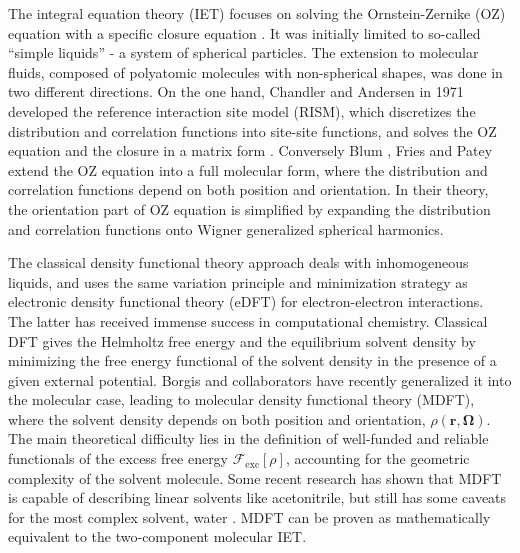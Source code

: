 The integral equation theory (\acs{IET}) focuses on solving the Ornstein-Zernike
(\acs{OZ}) equation with a specific closure equation \citep{Hensen-McDonald,Gray-Gubbins}.
It was initially limited to so-called ``simple liquids'' - a system
of spherical particles. The extension to molecular fluids, composed
of polyatomic molecules with non-spherical shapes, was done in two
different directions. On the one hand, Chandler and Andersen in 1971 \citep{Chandler_1972_RISM}
developed the reference interaction site model (\acs{RISM}), which
discretizes the distribution and correlation functions into site-site
functions, and solves the \acs{OZ} equation and the closure in a
matrix form \citep{hirata_molecular_2004}. Conversely Blum
\citep{Blum_I,Blum_II}, Fries and Patey \citep{Fries_Patey_1985}
extend the \acs{OZ} equation into a full molecular form, where the
distribution and correlation functions depend on both position and
orientation. In their theory, the orientation part of \acs{OZ} equation
is simplified by expanding the distribution and correlation functions
onto Wigner generalized spherical harmonics.

The classical density functional theory approach deals with inhomogeneous
liquids, and uses the same variation principle and minimization strategy
\citep{mermin_thermal_1965,Evans_1979,Hansen_1987} as electronic
density functional theory (e\acs{DFT}) for electron-electron interactions.
The latter has received immense success in computational chemistry.
Classical \acs{DFT} gives the Helmholtz free energy and the equilibrium
solvent density by minimizing the free energy functional of the solvent
density in the presence of a given external potential. Borgis and
collaborators \citep{gendre_classical_2009,jeanmairet_molecular_2013-1,jeanmairet_molecular_2015,jeanmairet_molecular_2016,Jeanmairet_thesis,levesque_solvation_2012,ramirez_density_2002,ramirez_density_2005,sergiievskyi_fast_2014,Zhao_2011}
have recently generalized it into the molecular case, leading to molecular
density functional theory (\acs{MDFT}), where the solvent density
depends on both position and orientation, $\rho(\mathbf{r},\mathbf{\Omega})$.
The main theoretical difficulty lies in the definition of well-funded
and reliable functionals of the excess free energy $\mathcal{F}_{\mathrm{exc}}\left[\rho\right]$,
accounting for the geometric complexity of the solvent molecule. Some
recent research has shown that \acs{MDFT} is capable of describing
linear solvents like acetonitrile, but still has some caveats
for the most complex solvent, water \citep{Zhao_2011}. \acs{MDFT}
can be proven as mathematically equivalent to the two-component
molecular \acs{IET}.

